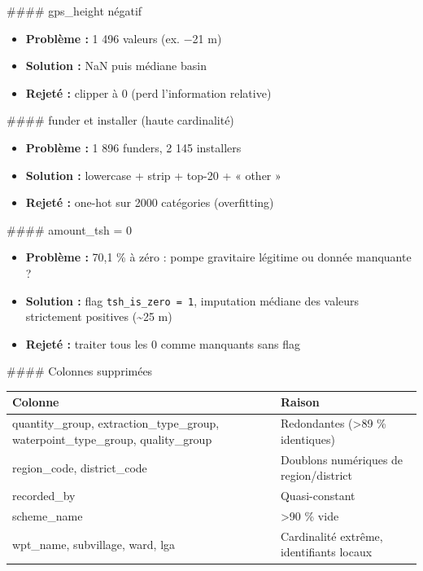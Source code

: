 \documentclass[11pt,a4paper]{report}
\begin{document}
\#\#\#\# gps\_height négatif



\begin{itemize}

\item \textbf{Problème :} 1 496 valeurs (ex. −21 m)

\item \textbf{Solution :} NaN puis médiane basin

\item \textbf{Rejeté :} clipper à 0 (perd l'information relative)

\end{itemize}



\#\#\#\# funder et installer (haute cardinalité)



\begin{itemize}

\item \textbf{Problème :} 1 896 funders, 2 145 installers

\item \textbf{Solution :} lowercase + strip + top-20 + « other »

\item \textbf{Rejeté :} one-hot sur 2000 catégories (overfitting)

\end{itemize}



\#\#\#\# amount\_tsh = 0



\begin{itemize}

\item \textbf{Problème :} 70,1 \% à zéro : pompe gravitaire légitime ou donnée manquante ?

\item \textbf{Solution :} flag \texttt{tsh\_is\_zero = 1}, imputation médiane des valeurs strictement positives (\textasciitilde{}25 m)

\item \textbf{Rejeté :} traiter tous les 0 comme manquants sans flag

\end{itemize}



\#\#\#\# Colonnes supprimées



\begin{longtable}{@{}ll@{}}
\toprule
Colonne & Raison \\
\midrule
quantity\_group, extraction\_type\_group, waterpoint\_type\_group, quality\_group & Redondantes (>89 \% identiques) \\
region\_code, district\_code & Doublons numériques de region/district \\
recorded\_by & Quasi-constant \\
scheme\_name & >90 \% vide \\
wpt\_name, subvillage, ward, lga & Cardinalité extrême, identifiants locaux \\
\bottomrule
\end{longtable}
\end{document}
